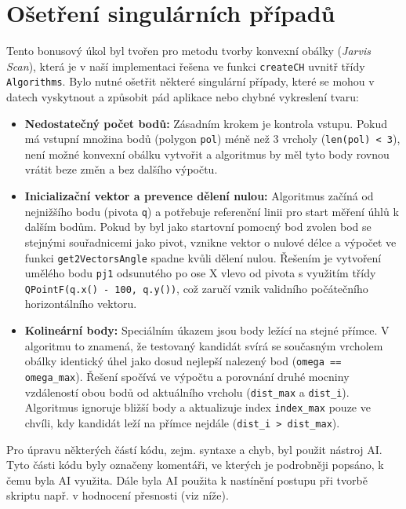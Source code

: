 \documentclass[12pt, a4paper]{article}
\begin{document}
\section{Ošetření singulárních případů}
Tento bonusový úkol byl tvořen pro metodu tvorby konvexní obálky (\textit{Jarvis Scan}), která je v naší implementaci řešena ve funkci \texttt{createCH} uvnitř třídy \texttt{Algorithms}. Bylo nutné ošetřit některé singulární případy, které se mohou v datech vyskytnout a způsobit pád aplikace nebo chybné vykreslení tvaru:

\begin{itemize}
    \item \textbf{Nedostatečný počet bodů:} Zásadním krokem je kontrola vstupu. Pokud má vstupní množina bodů (polygon \texttt{pol}) méně než 3 vrcholy (\texttt{len(pol) < 3}), není možné konvexní obálku vytvořit a algoritmus by měl tyto body rovnou vrátit beze změn a bez dalšího výpočtu.
    
    \item \textbf{Inicializační vektor a prevence dělení nulou:} Algoritmus začíná od nejnižšího bodu (pivota \texttt{q}) a potřebuje referenční linii pro start měření úhlů k dalším bodům. Pokud by byl jako startovní pomocný bod zvolen bod se stejnými souřadnicemi jako pivot, vznikne vektor o nulové délce a výpočet ve funkci \texttt{get2VectorsAngle} spadne kvůli dělení nulou. Řešením je vytvoření umělého bodu \texttt{pj1} odsunutého po ose X vlevo od pivota s využitím třídy \texttt{QPointF(q.x() - 100, q.y())}, což zaručí vznik validního počátečního horizontálního vektoru.
    
    \item \textbf{Kolineární body:} Speciálním úkazem jsou body ležící na stejné přímce. V algoritmu to znamená, že testovaný kandidát svírá se současným vrcholem obálky identický úhel jako dosud nejlepší nalezený bod (\texttt{omega == omega\_max}). Řešení spočívá ve výpočtu a porovnání druhé mocniny vzdáleností obou bodů od aktuálního vrcholu (\texttt{dist\_max} a \texttt{dist\_i}). Algoritmus ignoruje bližší body a aktualizuje index \texttt{index\_max} pouze ve chvíli, kdy kandidát leží na přímce nejdále (\texttt{dist\_i > dist\_max}).
\end{itemize}

Pro úpravu některých částí kódu, zejm. syntaxe a chyb, byl použit nástroj AI. Tyto části kódu byly označeny komentáři, ve kterých je podrobněji popsáno, k čemu byla AI využita. Dále byla AI použita k nastínění postupu při tvorbě skriptu např. v hodnocení přesnosti (viz níže).
\end{document}
